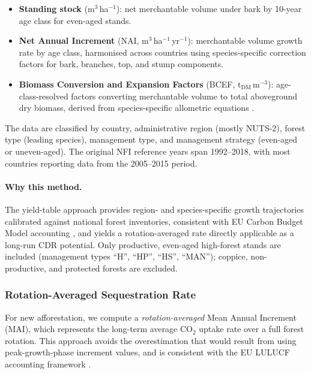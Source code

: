 \documentclass[12pt, a4paper]{article}
\begin{document}
\begin{itemize}[leftmargin=2em]
    \item \textbf{Standing stock} (m$^3$\,ha$^{-1}$): net merchantable volume
          under bark by 10-year age class for even-aged stands.
    \item \textbf{Net Annual Increment} (NAI, m$^3$\,ha$^{-1}$\,yr$^{-1}$):
          merchantable volume growth rate by age class, harmonised across
          countries using species-specific correction factors for bark,
          branches, top, and stump components.
    \item \textbf{Biomass Conversion and Expansion Factors} (BCEF,
          t$_\text{DM}$\,m$^{-3}$): age-class-resolved factors converting
          merchantable volume to total aboveground dry biomass, derived from
          species-specific allometric equations \citep{Boudewyn2007}.
\end{itemize}

The data are classified by country, administrative region (mostly NUTS-2),
forest type (leading species), management type, and management strategy
(even-aged or uneven-aged). The original NFI reference years span 1992--2018,
with most countries reporting data from the 2005--2015 period.

\paragraph{Why this method.}
The yield-table approach provides region- and species-specific growth
trajectories calibrated against national forest inventories, consistent with
EU Carbon Budget Model accounting \citep{Grassi2018}, and yields a
rotation-averaged rate directly applicable as a long-run CDR potential.
Only productive, even-aged high-forest stands are included (management types
``H'', ``HP'', ``HS'', ``MAN''); coppice, non-productive, and protected
forests are excluded.

\subsubsection{Rotation-Averaged Sequestration Rate}
\label{sec:affo_mai}

For new afforestation, we compute a \emph{rotation-averaged} Mean Annual
Increment (MAI), which represents the long-term average CO$_2$ uptake rate
over a full forest rotation. This approach avoids the overestimation that
would result from using peak-growth-phase increment values, and is consistent
with the EU LULUCF accounting framework \citep{EU2018841, EU2023839}.
\end{document}
